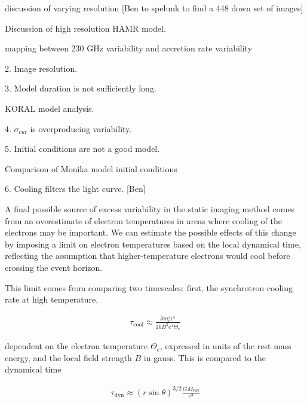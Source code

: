 discussion of varying resolution [Ben to spelunk to find a 448 down set of images]

Discussion of high resolution HAMR model.

mapping between 230 GHz variability and accretion rate variability

2. Image resolution. 

3. Model duration is not sufficiently long.

KORAL model analysis.

4. $\sigma_{cut}$ is overproducing variability.

5. Initial conditions are not a good model.

Comparison of Monika model initial conditions

6. Cooling filters the light curve. [Ben]

A final possible source of excess variability in the static imaging method comes from an overestimate of electron temperatures in areas where cooling of the electrons may be important.  We can estimate the possible effects of this change by imposing a limit on electron temperatures based on the local dynamical time, reflecting the assumption that higher-temperature electrons would cool before crossing the event horizon.

This limit comes from comparing two timescales: first, the synchrotron cooling rate at high temperature,

\begin{align}
    \tau_\mathrm{cool} \approx \frac{3 m_e^3 c^5}{16 B^2 e^4 \Theta_e}
\end{align}

dependent on the electron temperature $\Theta_e$, expressed in units of the rest mass energy, and the local field strength $B$ in gauss.  This is compared to the dynamical time

\begin{align}
    \tau_\mathrm{dyn} \approx \left( r \sin{\theta} \right) ^{3/2} \frac{G M_\mathrm{BH}}{c^3}
\end{align}



